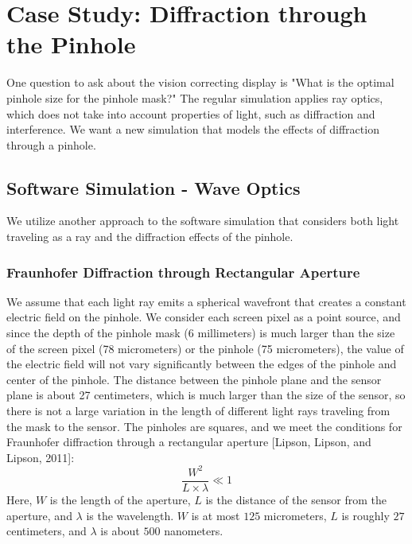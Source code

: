 \chapter{Case Study: Diffraction through the Pinhole}


One question to ask about the vision correcting display is "What is the optimal pinhole size for the pinhole mask?" The regular simulation applies ray optics, which does not take into account properties of light, such as diffraction and interference. We want a new simulation that models the effects of diffraction through a pinhole.

\section{Software Simulation - Wave Optics}

We utilize another approach to the software simulation that considers both light traveling as a ray and the diffraction effects of the pinhole. 

\subsection{Fraunhofer Diffraction through Rectangular Aperture}
\noindent We assume that each light ray emits a spherical wavefront that creates a constant electric field on the pinhole. We consider each screen pixel as a point source, and since the depth of the pinhole mask (6 millimeters) is much larger than the size of the screen pixel (78 micrometers) or the pinhole (75 micrometers), the value of the electric field will not vary significantly between the edges of the pinhole and center of the pinhole. The distance between the pinhole plane and the sensor plane is about 27 centimeters, which is much larger than the size of the sensor, so there is not a large variation in the length of different light rays traveling from the mask to the sensor. The pinholes are squares, and we meet the conditions for Fraunhofer diffraction through a rectangular aperture [Lipson, Lipson, and Lipson, 2011]: 
$$\frac{W^2}{L \times \lambda} \ll 1$$
Here, $W$ is the length of the aperture, $L$ is the distance of the sensor from the aperture, and $\lambda$ is the wavelength. $W$ is at most $125$ micrometers, $L$ is roughly $27$ centimeters, and $\lambda$ is about $500$ nanometers. 

